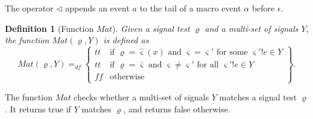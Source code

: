 \documentclass{fcs}
\newtheorem{mydef}{Definition}[section]
\newcommand{\sig}[0]{\varsigma}
\newcommand{\true}[0]{\mathit{tt}}
\newcommand{\false}[0]{\mathit{ff}}
\newcommand{\Match}[0]{\mathit{Mat}}
\newcommand{\append}[0]{\triangleleft}
\newcommand{\dddef}[0]{=_{df}}
\begin{document}
The operator $\append$ appends an event $a$ to the tail of a macro event $\alpha$ before $\epsilon$.

\begin{mydef}[Function $\Match$]
    \label{def:Function Match}
	Given a signal test $\varrho$ and a multi-set of signals $Y$, the function $\Match(\varrho, Y)$ is defined as
	$$
	\Match(\varrho, Y)\dddef \left\{
	\begin{array}{ll}
	\true & \mbox{if $\varrho=\hat{\sig}(x)$ and $\sig = \sig'$ for some $\sig'!e\in Y$}\\
	\true & \mbox{if $\varrho=\bar{\sig}$ and $\sig\neq \sig'$ for all $\sig'!e\in Y$}\\
	\false & \mbox{otherwise}
	\end{array}
	\right\}.
	$$
\end{mydef}

The function $\Match$ checks whether a multi-set of signals $Y$ matches a signal test $\varrho$.
It returns true if $Y$ matches $\varrho$, and returns false otherwise.
\end{document}
